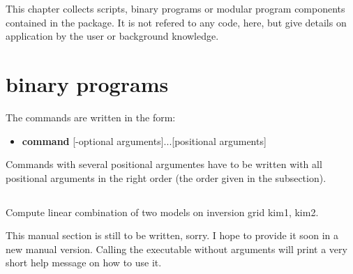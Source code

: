
%
%
%
This chapter collects scripts, binary programs or modular program components contained 
in the \ASKI package. It is not refered to any code, here, but give details on application
by the user or background knowledge.
%
\section{binary programs} \label{programs_scripts,sec:bin_prog}
%
The commands are written in the form:
\begin{itemize}
\item[]{\bf command} [-optional arguments]...[positional arguments]
\end{itemize}
Commands with several positional argumentes have to be written with all positional arguments in the right order (the order given in the subsection).
%
%
\subsection{} \label{programs_scripts,sec:bin_prog,sec:combine_inverted_models}
Compute linear combination      of two models on inversion grid kim1, kim2.

This manual section is still to be written, sorry. I hope to provide it soon in a new manual version. %
Calling the executable without arguments will print a very short help message on how to use it.
%
%
